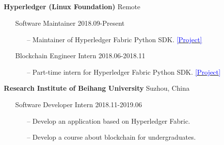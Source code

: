 \documentclass[11pt]{article}
\begin{document}
\subsection*{}
\begin{itemize}[leftmargin=0em, noitemsep, nolistsep]
    \setlength\itemsep{1em}
    \item[] \large\textbf{Hyperledger (Linux Foundation)} \hfill Remote
        \begin{itemize}[noitemsep, nolistsep, leftmargin=0em]
            \item[] Software Maintainer \hfill 2018.09-Present
             \begin{itemize}
                \small
                \item[--] Maintainer of Hyperledger Fabric Python SDK. \href{https://github.com/hyperledger/fabric-sdk-py}{\textcolor{blue}{[Project]}}
             \end{itemize}
            \item[] Blockchain Engineer Intern \hfill 2018.06-2018.11
             \begin{itemize}
                \small
                \item[--] Part-time intern for Hyperledger Fabric Python SDK. \href{https://github.com/hyperledger/fabric-sdk-py}{\textcolor{blue}{[Project]}}
             \end{itemize}
        \end{itemize} 
    \item[] \large\textbf{Research Institute of Beihang University} \hfill Suzhou, China
        \begin{itemize}[noitemsep, nolistsep, leftmargin=0em]
            \item[] Software Developer Intern \hfill 2018.11-2019.06
             \begin{itemize}
                \small
                \item[--] Develop an application based on Hyperledger Fabric.
                \item[--] Develop a course about blockchain for undergraduates.
             \end{itemize}
        \end{itemize} 
\end{itemize}
\end{document}

